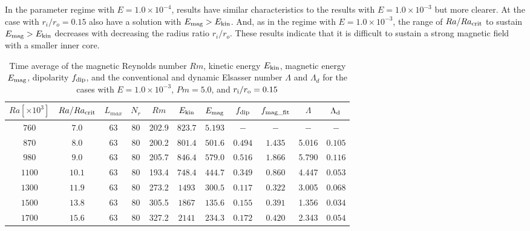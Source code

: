 {\color{blue}
In the parameter regime with $E = 1.0 \times 10^{-4}$, results have similar characteristics to the results with $E = 1.0 \times 10^{-3}$ but more clearer. At the case with $r_i/r_o = 0.15$ also have a solution with $E_{\rm mag} > E_{\rm kin}$. And, as in the regime with $E = 1.0 \times 10^{-3}$, the range of $Ra / Ra_{\rm crit}$ to sustain $E_{\rm mag} > E_{\rm kin}$ decreases with decreasing the radius ratio $r_i / r_o$.
}
{\color{red}
These results indicate that it is difficult to sustain a strong magnetic field with a smaller inner core.
}
%
\begin{table}
\caption{Time average of the magnetic Reynolds number $Rm$, kinetic energy $E_{\rm kin}$, magnetic energy $E_{\rm mag}$, dipolarity $f_{\rm dip}$, and {\color{red} the conventional and dynamic Elsasser number $\Lambda$ and $\Lambda_{d}$ for the cases with $E = 1.0 \times 10^{-3}$, $Pm = 5.0$, and} $r_{\rm i}/r_{\rm o} = 0.15$}
  \begin{tabular}{ccccccccccc}
      \hline
     $Ra[\times 10^3]$  &  $Ra/Ra_{\rm crit}$&
     {\color{red} $L_{max}$} & {\color{red} $N_{r}$} & {\color{red} $Rm$} & $E_{\rm kin}$  &  $E_{\rm mag}$ & $f_{\rm dip}$ & $f_{\rm mag\_fit}$ & $\Lambda$ & $\Lambda_{\rm d}$\\
    \hline
    $760$  & $7.0$ & 63 & 80 &  202.9 & $823.7$ & $5.193$ & $-$ & $-$ & $-$ & $-$ \\
    $870$  & $8.0$ & 63 & 80 &  200.2 & $801.4$ & $501.6$ & $0.494$ & $1.435$ & 5.016 & $0.105$\\
    $980$  & $9.0$ & 63 & 80 &  205.7 & $846.4$ & $579.0$ & $0.516$ & $1.866$ & 5.790 & $0.116$\\
    $1100$  & $10.1$ & 63 & 80 &  193.4 & $748.4$ & $444.7$ & $0.349$ & $0.860$ & 4.447  & $0.053$\\
    $1300$  & $11.9$ & 63 & 80 &  273.2 & $1493$ & $300.5$ & $0.117$ & $0.322$ & 3.005 & $0.068$\\
    $1500$  & $13.8$ & 63 & 80 &  305.5 & $1867$ & $135.6$ & $0.155$ & $0.391$ & 1.356 & $0.034$\\
    $1700$  & $15.6$ & 63 & 80 & 327.2 & $2141$ & $234.3$ & $0.172$ & $0.420$ & 2.343 & $0.054$\\
     \hline
  \end{tabular}
 \label{table:Summary_15}
 \end{table}
 

